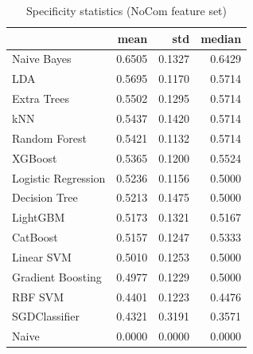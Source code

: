 \begin{table}
\caption{Specificity statistics (NoCom feature set)}
\label{tab:specificity_NoCom_stats}
\begin{tabular}{lrrr}
\toprule
 & mean & std & median \\
\midrule
Naive Bayes & 0.6505 & 0.1327 & 0.6429 \\
LDA & 0.5695 & 0.1170 & 0.5714 \\
Extra Trees & 0.5502 & 0.1295 & 0.5714 \\
kNN & 0.5437 & 0.1420 & 0.5714 \\
Random Forest & 0.5421 & 0.1132 & 0.5714 \\
XGBoost & 0.5365 & 0.1200 & 0.5524 \\
Logistic Regression & 0.5236 & 0.1156 & 0.5000 \\
Decision Tree & 0.5213 & 0.1475 & 0.5000 \\
LightGBM & 0.5173 & 0.1321 & 0.5167 \\
CatBoost & 0.5157 & 0.1247 & 0.5333 \\
Linear SVM & 0.5010 & 0.1253 & 0.5000 \\
Gradient Boosting & 0.4977 & 0.1229 & 0.5000 \\
RBF SVM & 0.4401 & 0.1223 & 0.4476 \\
SGDClassifier & 0.4321 & 0.3191 & 0.3571 \\
Naive & 0.0000 & 0.0000 & 0.0000 \\
\bottomrule
\end{tabular}
\end{table}
